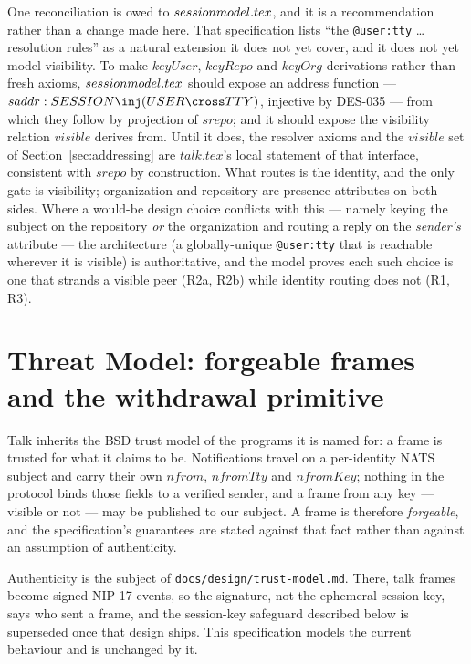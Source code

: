 \documentclass[a4paper,10pt,fleqn]{article}
\begin{document}
One reconciliation is owed to $session\-model.tex$, and it is a
recommendation rather than a change made here.  That specification lists
``the \texttt{@user:tty} \ldots resolution rules'' as a natural
extension it does not yet cover, and it does not yet model visibility.
To make $keyUser$, $keyRepo$ and $keyOrg$ derivations rather than fresh
axioms, $session\-model.tex$ should expose an address function ---
$saddr : SESSION \inj (USER \cross TTY)$, injective by DES-035 --- from
which they follow by projection of $srepo$; and it should expose the
visibility relation $visible$ derives from.  Until it does, the resolver
axioms and the $visible$ set of Section~\ref{sec:addressing} are
$talk.tex$'s local statement of that interface, consistent with $srepo$
by construction.  What routes is the identity, and the only gate is
visibility; organization and repository are presence attributes on both
sides.  Where a would-be design choice conflicts with this --- namely
keying the subject on the repository \emph{or} the organization and
routing a reply on the \emph{sender's} attribute --- the architecture
(a globally-unique \texttt{@user:tty} that is reachable wherever it is
visible) is authoritative, and the model proves each such choice is one
that strands a visible peer (R2a, R2b) while identity routing does not
(R1, R3).

\section{Threat Model: forgeable frames and the withdrawal primitive}
\label{sec:threat}

Talk inherits the BSD trust model of the programs it is named for: a frame
is trusted for what it claims to be.  Notifications travel on a per-identity
NATS subject and carry their own $nfrom$, $nfromTty$ and $nfromKey$;
nothing in the protocol binds those fields to a verified sender, and a frame
from any key --- visible or not --- may be published to our subject.  A frame
is therefore \emph{forgeable}, and the specification's guarantees are stated
against that fact rather than against an assumption of authenticity.

Authenticity is the subject of \texttt{docs/design/trust-model.md}.  There, talk
frames become signed NIP-17 events, so the signature, not the ephemeral
session key, says who sent a frame, and the session-key safeguard described
below is superseded once that design ships.  This specification models the
current behaviour and is unchanged by it.
\end{document}
